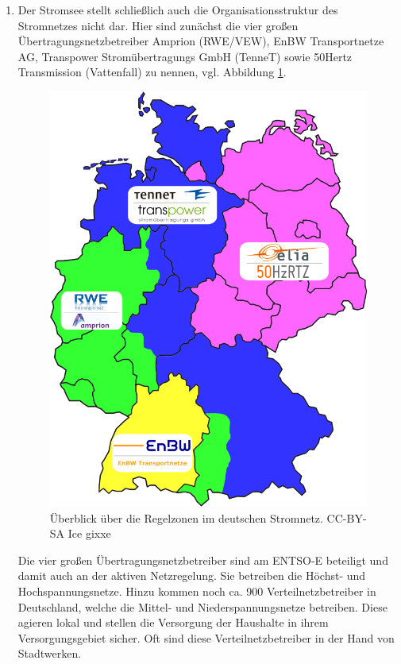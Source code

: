 \documentclass[12pt,BCOR=8.5mm]{scrartcl}
\begin{document}
\begin{enumerate}
  \item Der Stromsee stellt schließlich auch die Organisationsstruktur
    des Stromnetzes nicht dar. Hier sind zunächst die vier großen
    Übertragungsnetzbetreiber Amprion (RWE/VEW), EnBW Transportnetze AG,
    Transpower Stromübertragungs GmbH (TenneT) sowie 50Hertz
    Transmission (Vattenfall) zu nennen, vgl. Abbildung \ref{fig:regelzonen}.
    \begin{figure}[htbp]
      \begin{center}
        \includegraphics[width=12cm]{figures/Regelzonen_deutscher_Netzbetreiber_neu.png}
        \caption{Überblick über die Regelzonen im deutschen Stromnetz.
        CC-BY-SA Ice gixxe}
        \label{fig:regelzonen}
      \end{center}
    \end{figure}
    Die vier großen Übertragungsnetzbetreiber sind am ENTSO-E
    beteiligt und damit auch an der aktiven Netzregelung. Sie betreiben
    die Höchst- und Hochspannungsnetze. Hinzu kommen
    noch ca. 900 Verteilnetzbetreiber in Deutschland, welche die Mittel-
    und Niederspannungsnetze betreiben. Diese agieren
    lokal und stellen die Versorgung der Haushalte in ihrem
    Versorgungsgebiet sicher. Oft sind diese Verteilnetzbetreiber in der
    Hand von Stadtwerken.


\end{enumerate}
\end{document}
